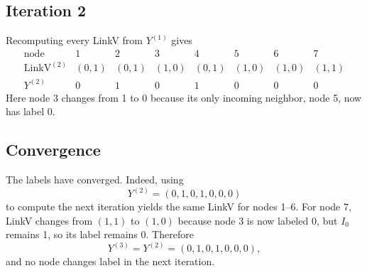 \subsection{Iteration 2}

\begin{solution}
Recomputing every LinkV from $Y^{(1)}$ gives
\[
\begin{array}{c|ccccccc}
  \text{node} & 1 & 2 & 3 & 4 & 5 & 6 & 7 \\ \hline
  \text{LinkV}^{(2)}
    & (0,1) & (0,1) & (1,0) & (0,1) & (1,0) & (1,0) & (1,1) \\
  Y^{(2)}
    & 0 & 1 & 0 & 1 & 0 & 0 & 0
\end{array}
\]
Here node 3 changes from 1 to 0 because its only incoming neighbor, node 5,
now has label 0.
\end{solution}

\subsection{Convergence}

\begin{solution}
The labels have converged.  Indeed, using
\[
  Y^{(2)}=(0,1,0,1,0,0,0)
\]
to compute the next iteration yields the same LinkV for nodes 1--6.  For node
7, LinkV changes from $(1,1)$ to $(1,0)$ because node 3 is now labeled 0, but
$I_0$ remains 1, so its label remains 0.  Therefore
\[
  \boxed{Y^{(3)}=Y^{(2)}=(0,1,0,1,0,0,0)},
\]
and no node changes label in the next iteration.
\end{solution}
